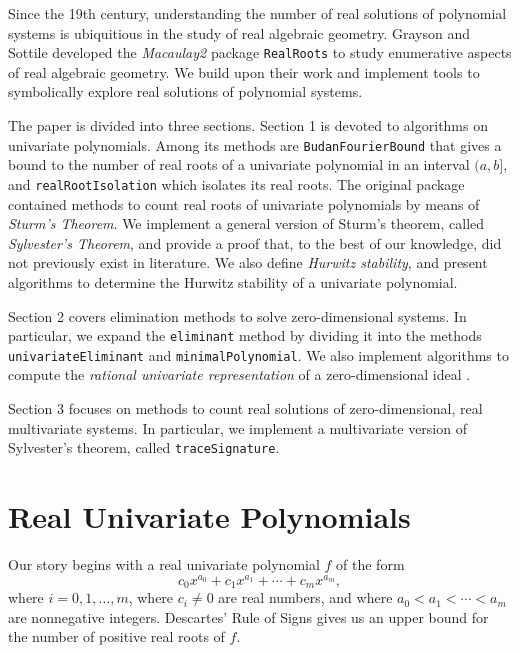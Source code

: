 \documentclass[12pt]{amsart}
\theoremstyle{definition}
\begin{document}
Since the 19th century, understanding the number of real solutions of polynomial systems is ubiquitious in the study of real algebraic geometry. Grayson and Sottile \cite{MR1949550} developed the \textit{Macaulay2} package \texttt{RealRoots} to study enumerative aspects of real algebraic geometry. We build upon their work and implement tools to symbolically explore real solutions of polynomial systems.

The paper is divided into three sections. Section 1 is devoted to algorithms on  univariate polynomials. Among its methods are \texttt{BudanFourierBound} that gives a bound to the number of real roots of a univariate polynomial in an interval $(a,b]$, and \texttt{realRootIsolation} which isolates its real roots. The original package contained methods to count real roots of univariate polynomials by means of \textit{Sturm's Theorem}. We implement a general version of Sturm's theorem, called \textit{Sylvester's Theorem}, and provide a proof that, to the best of our knowledge, did not previously exist in literature. We also define \textit{Hurwitz stability}, and present algorithms to determine the Hurwitz stability of a univariate polynomial. 

Section 2 covers elimination methods to solve zero-dimensional systems. In particular, we expand the \texttt{eliminant} method by dividing it into the methods \texttt{univariateEliminant} and \texttt{minimalPolynomial}. We also implement algorithms to compute the \textit{rational univariate representation} of a zero-dimensional ideal \cite{cite-key}. 

Section 3 focuses on methods to count real solutions of zero-dimensional, real multivariate systems. In particular, we implement a multivariate version of Sylvester's theorem, called \texttt{traceSignature}.

\section{Real Univariate Polynomials}

Our story begins with a real univariate polynomial $f$ of the form $$c_{0}x^{a_{0}} + c_{1}x^{a_{1}} + \cdots + c_{m}x^{a_{m}},$$ where $i=0,1,\dots, m$, where $c_{i} \neq 0$ are real numbers, and where $a_{0} < a_{1} < \cdots < a_{m}$ are nonnegative integers. Descartes' Rule of Signs \cite{MR2830310} gives us an upper bound for the number of positive real roots of $f$.
\end{document}
